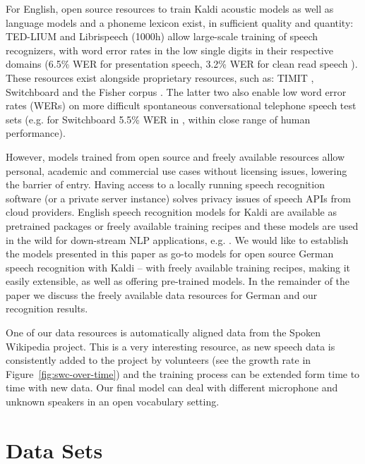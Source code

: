 \documentclass[a4paper]{article}
\begin{document}
For English, open source resources to train Kaldi acoustic models as well as language models and a phoneme lexicon exist, in sufficient quality and quantity: TED-LIUM \cite{rousseau2014enhancing, hernandez2018ted} and Librispeech (1000h) \cite{panayotov2015librispeech} allow large-scale training of speech recognizers, with word error rates in the low single digits in their respective domains (6.5\% WER for presentation speech, 3.2\% WER for clean read speech  \cite{han2017capio}). These resources exist alongside proprietary resources, such as: TIMIT \cite{garofolo1993darpa}, Switchboard \cite{godfrey1992switchboard} and the Fisher corpus \cite{cieri2004fisher}. The latter two also enable low word error rates (WERs) on more difficult spontaneous conversational telephone speech test sets (e.g. for Switchboard 5.5\% WER in \cite{saon2017english}, within close range of human performance).

However, models trained from open source and freely available resources allow personal, academic and commercial use cases without licensing issues, lowering the barrier of entry.  Having access to a locally running speech recognition software (or a private server instance) solves privacy issues of speech APIs from cloud providers. English speech recognition models for Kaldi are available as pretrained packages or freely available training recipes and these models are used in the wild for down-stream NLP applications, e.g. \cite{oualil2017context, milde2016ambient}. We would like to establish the models presented in this paper as go-to models for open source German speech recognition with Kaldi -- with freely available training recipes, making it easily extensible, as well as offering pre-trained models. In the remainder of the paper we discuss the freely available data resources for German and our recognition results.

One of our data resources is automatically aligned data from the Spoken Wikipedia project. This is a very interesting resource, as new speech data is consistently added to the project by volunteers (see the growth rate in Figure~\ref{fig:swc-over-time}) and the training process can be extended form time to time with new data. Our final model can deal with different microphone and unknown speakers in an open vocabulary setting. 

\section{Data Sets}
\label{sec:data-sets}
\end{document}
